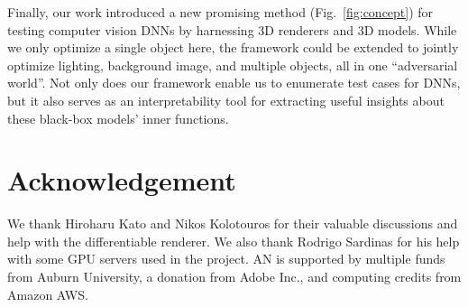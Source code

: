 \documentclass[10pt,twocolumn,letterpaper]{article}
\begin{document}
Finally, our work introduced a new promising method (Fig.~\ref{fig:concept}) for testing computer vision DNNs by harnessing 3D renderers and 3D models.
While we only optimize a single object here, the framework could be extended to jointly optimize lighting, background image, and multiple objects, all in one ``adversarial world''.
Not only does our framework enable us to enumerate test cases for DNNs, but it also serves as an interpretability tool for extracting useful insights about these black-box models' inner functions.








\section*{Acknowledgement}
We thank Hiroharu Kato and Nikos Kolotouros for their valuable discussions and help with the differentiable renderer.
We also thank Rodrigo Sardinas for his help with some GPU servers used in the project.
AN is supported by multiple funds from Auburn University, a donation from Adobe Inc., and computing credits from Amazon AWS.



{\small


}

\clearpage

\renewcommand{\thesection}{S\arabic{section}}
\renewcommand{\thesubsection}{\thesection.\arabic{subsection}}

\newcommand{\beginsupplementary}{%
            \setcounter{table}{0}
    \renewcommand{\thetable}{S\arabic{table}}%
            \setcounter{figure}{0}
    \renewcommand{\thefigure}{S\arabic{figure}}%
    \setcounter{section}{0}
}
\newcommand{\suptitle}{Supplementary materials for:\\\papertitle}

\newcommand{\toptitlebar}{
    \hrule height 4pt
    \vskip 0.25in
    \vskip -\parskip%
}
\newcommand{\bottomtitlebar}{
    \vskip 0.29in
    \vskip -\parskip%
    \hrule height 1pt
    \vskip 0.09in%
}


\beginsupplementary%

\newcommand{\maketitlesupp}{
    \newpage
    \onecolumn%
        \null%
        \vskip .375in
        \begin{center}
            {\Large \bf \suptitle\par}
            \vspace*{24pt}
            {
                \large
                \lineskip=.5em
                \par
            }
            \vskip .5em
            \vspace*{12pt}
        \end{center}
}
\end{document}
